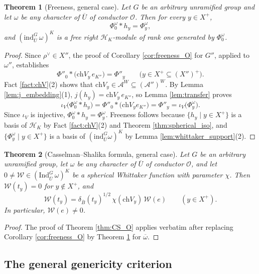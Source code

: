 \documentclass[12pt]{article}
\numberwithin{equation}{section}
\newtheorem{theorem}{Theorem}[section]
\theoremstyle{definition}
\theoremstyle{remark}
\theoremstyle{plain}
\begin{document}
\begin{theorem}[Freeness, general case]\label{thm:freeness_general}
Let $G$ be an arbitrary unramified group and let $\omega$ be any character of $\overline U$ of conductor $\mathcal O$. Then for every $y \in X^+$,
$$\Phi^\omega_0 * h_y = \Phi^\omega_y,$$
and $(\mathrm{ind}_{\overline{U}}^G\,\omega)^K$ is a free right $\mathcal{H}_K$-module of rank one generated by $\Phi^\omega_0$.
\end{theorem}
\begin{proof}
Since $\rho^\vee \in X''$, the proof of Corollary \ref{cor:freeness_O} for $G''$, applied to $\omega''$, establishes
$$\Phi''_0 * \big(\mathrm{ch}V_y\, e_{K''}\big) = \Phi''_y \qquad \big(y \in X^+ \subseteq (X'')^+\big).$$
Fact \ref{fact:chV}(2) shows that $\mathrm{ch}V_y \in \mathcal{A}^W \subseteq (\mathcal{A}'')^W$. By Lemma \ref{lem:j_embedding}(1), $j(h_y) = \mathrm{ch}V_y\, e_{K''}$, so Lemma \ref{lem:transfer} proves
$$\iota_V\big(\Phi^\omega_0 * h_y\big) = \Phi''_0 * \big(\mathrm{ch}V_y e_{K''}\big) = \Phi''_y = \iota_V\big(\Phi^\omega_y\big).$$
Since $\iota_V$ is injective, $\Phi^\omega_0 * h_y = \Phi^\omega_y$. Freeness follows because $\{h_y\mid y\in X^+\}$ is a basis of $\mathcal H_K$ by Fact \ref{fact:chV}(2) and Theorem \ref{thm:spherical_iso}, and $\{\Phi^\omega_y\mid y\in X^+\}$ is a basis of $(\mathrm{ind}_{\overline U}^G\omega)^K$ by Lemma \ref{lem:whittaker_support}(2).
\end{proof}

\begin{theorem}[Casselman--Shalika formula, general case]\label{thm:CS_general}
Let $G$ be an arbitrary unramified group, let $\omega$ be any character of $\overline U$ of conductor $\mathcal O$, and let $0 \neq \mathcal{W} \in (\mathrm{Ind}_{\overline{U}}^G\, \omega)^K$ be a spherical Whittaker function with parameter $\chi$. Then $\mathcal{W}(t_y) = 0$ for $y \notin X^+$, and
\[
\mathcal{W}(t_y) = \delta_{\overline{B}}(t_y)^{1/2}\, \chi(\mathrm{ch}V_y)\, \mathcal{W}(e) \qquad (y \in X^+).
\]
In particular, $\mathcal{W}(e) \neq 0$.
\end{theorem}
\begin{proof}
The proof of Theorem \ref{thm:CS_O} applies verbatim after replacing Corollary \ref{cor:freeness_O} by Theorem \ref{thm:freeness_general} for $\overline\omega$.
\end{proof}

\subsection{The general genericity criterion}
\end{document}
